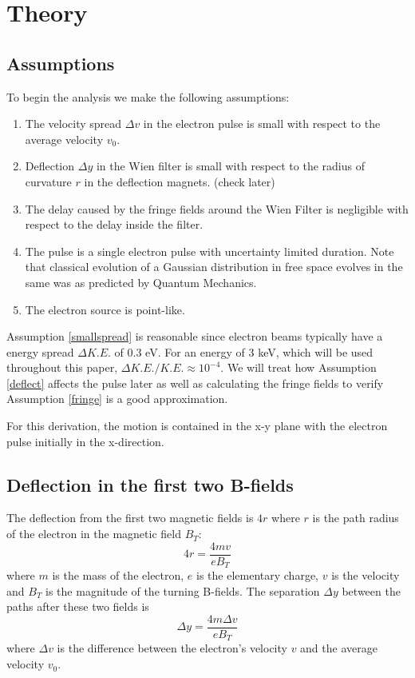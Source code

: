 \documentclass[12pt,letterpaper]{article}
\newcommand{\dv}{\Delta v}
\newcommand{\dy}{\Delta y}
\newcommand{\dd}{\Delta }
\begin{document}
\section{Theory}
\subsection{Assumptions}
To begin the analysis we make the following assumptions:
\begin{enumerate}
   \item The velocity spread $\dv$ in the electron pulse is small with respect to the average velocity $v_0$. \label{smallspread}
   \item Deflection $\dy$ in the Wien filter is small with respect to the radius of curvature $r$ in the deflection magnets. (check later)
      \label{deflect}
   \item The delay caused by the fringe fields around the Wien Filter is negligible with respect to the delay inside the filter.
      \label{fringe}
   \item The pulse is a single electron pulse with uncertainty limited duration. Note that classical evolution of a Gaussian distribution in free space evolves in the same was as predicted by Quantum Mechanics.
   \item The electron source is point-like.
      \label{pointlike}
\end{enumerate}
Assumption \ref{smallspread} is reasonable since electron beams typically have a energy spread $\dd K.E.$ of 0.3 eV. 
For an energy of 3 keV, which will be used throughout this paper, $\dd K.E./K.E. \approx 10^{-4}$.
We will treat how Assumption \ref{deflect} affects the pulse later as well as calculating the fringe fields to verify Assumption \ref{fringe} is a good approximation. 

For this derivation, the motion is contained in the x-y plane with the electron pulse initially in the x-direction. 

\subsection{Deflection in the first two B-fields}
The deflection from the first two magnetic fields is  $4r$ where $r$ is the path radius of the electron in the magnetic field $B_T$:
\begin{equation}
4r=\frac{4mv}{eB_T}
\label{radius}
\end{equation}
where $m$ is the mass of the electron, $e$ is the elementary charge, $v$ is the velocity and $B_T$ is the magnitude of the turning B-fields. 
The separation $\dy$ between the paths after these two fields is
\begin{equation}
   \dy = \frac{4m\dv}{eB_T}
   \label{dy}
\end{equation}
where $\dv$ is the difference between the electron's velocity $v$ and the average velocity $v_0$. 
\end{document}
